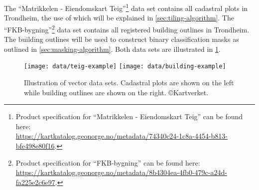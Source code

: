 The \enquote{Matrikkelen - Eiendomskart Teig}\footnote{Product specification for \enquote{Matrikkelen - Eiendomskart Teig} can be found here:\\\url{https://kartkatalog.geonorge.no/metadata/74340c24-1c8a-4454-b813-bfe498e80f16}.} data set contains all cadastral plots in Trondheim, the use of which will be explained in \cref{sec:tiling-algorithm}.
The \enquote{FKB-bygning}\footnote{Product specification for \enquote{FKB-bygning} can be found here:\\\url{https://kartkatalog.geonorge.no/metadata/8b4304ea-4fb0-479c-a24d-fa225e2c6e97}.} data set contains all registered building outlines in Trondheim.
The building outlines will be used to construct binary classification masks as outlined in \cref{sec:masking-algorithm}.
Both data sets are illustrated in \cref{fig:vector-data-example}.

\begin{figure}[htb]
  \texttt{[image: data/teig-example]}
  \texttt{[image: data/building-example]}
  \caption{%
    Illustration of vector data sets.
    Cadastral plots are shown on the left while building outlines are shown on the right.
    \copyright{Kartverket}.
  }%
  \label{fig:vector-data-example}
\end{figure}
